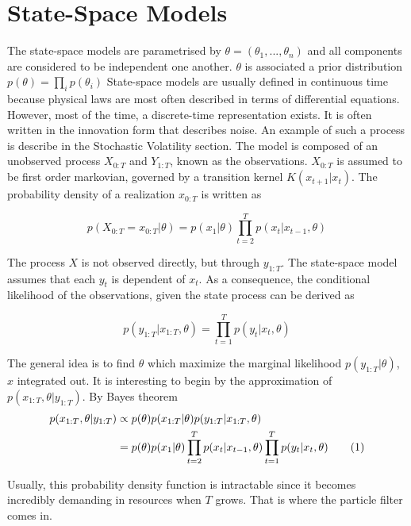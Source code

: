 \documentclass[11pt,a4,twosided,singlespacing,titlepagenumber=on]{scrreprt}
\numberwithin{equation}{chapter} %
\theoremstyle{remark}
\newcommand\numberthis{\addtocounter{equation}{1}\tag{\theequation}}
\begin{document}
\section{State-Space Models}
The state-space models are parametrised by $\theta = (\theta_1,...,\theta_n)$ and all components are considered to be independent one another. $\theta$ is associated a prior distribution $p(\theta) = \prod_i p(\theta_i)$ State-space models are usually defined in continuous time because physical laws are most often described in terms of differential equations. However, most of the time, a discrete-time representation exists. It is often written in the innovation form that describes noise. An example of such a process is describe in the Stochastic Volatility section. The model is composed of an unobserved process $X_{0:T}$ and $Y_{1:T}$, known as the observations. $X_{0:T}$ is assumed to be first order markovian, governed by a transition kernel $K(x_{t+1}|x_t)$. The probability density of a realization $x_{0:T}$ is written as

\begin{equation}
p(X_{0:T} = x_{0:T} | \theta) = p(x_1|\theta) \prod_{t=2}^T p(x_t|x_{t-1}, \theta) 
\end{equation}

The process $X$ is not observed directly, but through $y_{1:T}$. The state-space model assumes that each $y_t$ is dependent of $x_t$. As a consequence, the conditional likelihood of the observations, given the state process can be derived as

\begin{equation}
p(y_{1:T} | x_{1:T}, \theta) = \prod_{t=1}^T p(y_t | x_t, \theta) 
\end{equation}

The general idea is to find $\theta$ which maximize the marginal likelihood $p(y_{1:T}|\theta)$, $x$ integrated out. It is interesting to begin by the approximation of $p(x_{1:T}, \theta | y_{1:T})$. By Bayes theorem
\begin{align*}
p(x_{1:T}, \theta | y_{1:T}) &\propto p(\theta)p(x_{1:T}|\theta)p(y_{1:T}|x_{1:T}, \theta)  \\
 &= p(\theta) p(x_1|\theta) \prod_{t=2}^T p(x_t|x_{t-1}, \theta) \prod_{t=1}^T p(y_t | x_t, \theta) \numberthis
\end{align*}


Usually, this probability density function is intractable since it becomes incredibly demanding in resources when $T$ grows. That is where the particle filter comes in.
\end{document}
